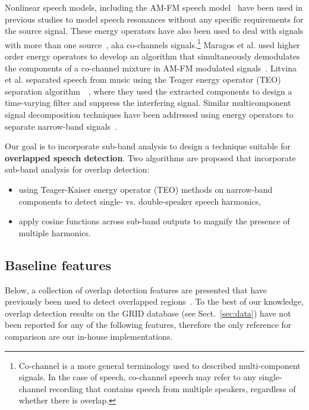 Nonlinear speech models, including the AM-FM speech model~\cite{maragos_kaiser_quatieri} have been used in previous studies to model speech resonances without any specific requirements for the source signal. 
These energy operators have also been used to deal with signals with more than one source~\cite{maragos_instantaneousenergy}, aka co-channels signals.\footnote{Co-channel is a more general terminology used to described multi-component signals. 
In the case of speech, co-channel speech may refer to any single-channel recording that contains speech from multiple speakers, regardless of whether there is overlap.}
Maragos et al. used higher order energy operators to develop an algorithm that simultaneously demodulates the components of a co-channel mixture in AM-FM modulated signals~\cite{maragos_instantaneousenergy}. 
Litvina et al. separated speech from music using the Teager energy operator (TEO) separation algorithm~\cite{maragos_kaiser_quatieri}~\cite{Litvin2010}, where they used the extracted components to design a time-varying filter and suppress the interfering signal. 
Similar multicomponent signal decomposition techniques have been addressed using energy operators to separate narrow-band signals~\cite{Linicassp95,hu12_nullspacepersuit,santhanam_maragos_2000}. 

Our goal is to incorporate sub-band analysis to design a technique suitable for {\bf overlapped speech detection}. 
Two algorithms are proposed that incorporate sub-band analysis for overlap detection: 
\begin{itemize}
	\item using Teager-Kaiser energy operator (TEO) methods on narrow-band components to detect single- vs. double-speaker speech harmonics, 
	\item apply cosine functions across sub-band outputs to magnify the presence of multiple harmonics. 
\end{itemize}



\subsection{Baseline features}
\label{ssec:baseline}
Below, a collection of overlap detection features are presented that have previously been used to detect overlapped regions~\cite{nav_icassp13,boakye_thesis,sapvr_2000}. 
To the best of our knowledge, overlap detection results on the GRID database (see Sect.~\ref{sec:data}) have not been reported for any of the following features, therefore the only reference for comparison are our in-house implementations. %

